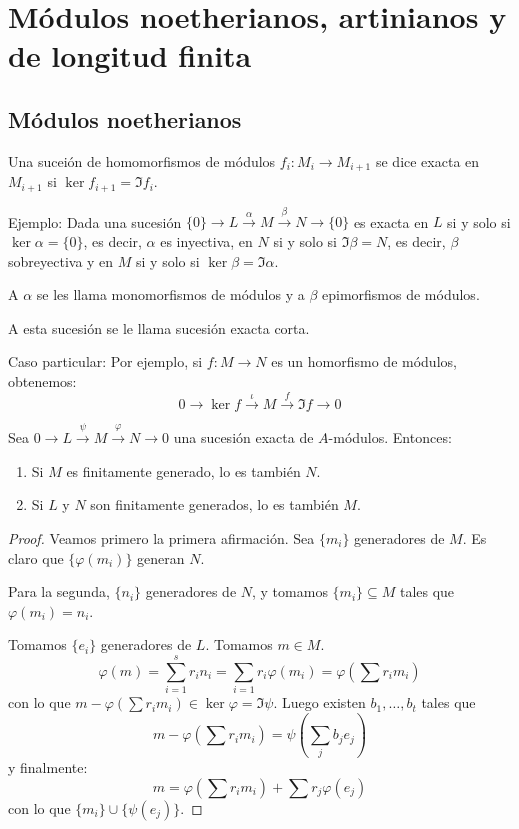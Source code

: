 \section{Módulos noetherianos, artinianos y de longitud finita}
\subsection{Módulos noetherianos}

\begin{df}
  Una suceión de homomorfismos de módulos \(f_i:M_i\longrightarrow
  M_{i+1}\) se dice exacta en
  \(M_{i+1}\) si \(\ker f_{i+1}=\Im f_i\).
\end{df}

Ejemplo: Dada una sucesión \(\{0\}\longrightarrow L 
\overset{\alpha}{\longrightarrow} M 
\overset{\beta}{\longrightarrow} N\longrightarrow \{0\}\)
es exacta en \(L\) si y solo si \(\ker \alpha=\{0\}\), es decir,
\(\alpha\) es inyectiva, en \(N\) si y solo si \(\Im \beta = N\),
es decir, \(\beta\) sobreyectiva y en \(M\) si y solo si
\(\ker\beta=\Im\alpha\).

A \(\alpha\) se les llama monomorfismos de módulos y a
\(\beta\) epimorfismos de módulos.

A esta sucesión se le llama sucesión exacta corta.

Caso particular: Por ejemplo, si \(f:M\longrightarrow N\) es
un homorfismo de módulos, obtenemos:
\[
  0\longrightarrow\ker f\overset{\iota}{\longrightarrow}
  M \overset{f}{\longrightarrow}\Im f
  \longrightarrow 0
\]

\begin{prop}
  Sea \(0\longrightarrow L\overset{\psi}{\longrightarrow} M
  \overset{\varphi}{\longrightarrow}
  N\longrightarrow 0\) una sucesión exacta de \(A\)-módulos. Entonces:
  \begin{enumerate}
    \item Si \(M\) es finitamente generado, lo es también \(N\).
    \item Si \(L\) y \(N\) son finitamente generados, lo es también \(M\).
  \end{enumerate}
\end{prop}

\begin{proof}
  Veamos primero la primera afirmación. Sea \(\{m_i\}\) generadores de \(M\).
  Es claro que \(\{\varphi(m_i)\}\) generan \(N\).

  Para la segunda, \(\{n_i\}\) generadores de \(N\), y tomamos
  \(\{m_i\}\subseteq M\) tales que \(\varphi(m_i)= n_i\).

  Tomamos \(\{e_i\}\) generadores de \(L\). Tomamos \(m\in M\).
  \[
    \varphi(m)=\sum_{i=1}^s r_i n_i = \sum_{i=1} r_i\varphi(m_i)
    =\varphi\left(\sum r_i m_i\right)
  \]
  con lo que \(m-\varphi(\sum r_i m_i)\in\ker\varphi=\Im\psi\).
  Luego existen \(b_1,\ldots, b_t\) tales que
  \[
    m-\varphi\left(\sum r_i m_i\right)=
    \psi\left(\sum_j b_j e_j\right)
  \]
  y finalmente:
  \[
    m=\varphi\left(\sum r_i m_i\right)+\sum r_j \varphi(e_j)
  \]
  con lo que \(\{m_i\}\cup\{\psi(e_j)\}\).
\end{proof}

